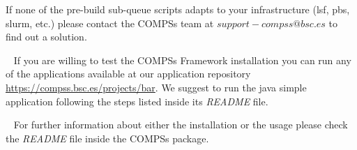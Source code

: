 If none of the pre-build sub-queue scripts adapts to your infrastructure (lsf, pbs, slurm, etc.) please contact 
the COMPSs team at $support-compss@bsc.es$ to find out a solution.

~ \newline
If you are willing to test the COMPSs Framework installation you can run any of the applications available at our application 
repository \url{https://compss.bsc.es/projects/bar}. We suggest to run the java simple application following the steps listed
inside its \textit{README} file. 

~ \newline
For further information about either the installation or the usage please check the \textit{README} file inside the COMPSs package. 

